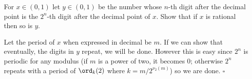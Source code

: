 
\begin{problem}[ISL 2006 N2]
    For $x \in (0, 1)$ let $y \in (0, 1)$ be the number whose $n$-th digit after the decimal point is the $2^n$-th digit after the decimal point of $x$. Show that if $x$ is rational then so is $y$.
\end{problem}

\begin{solution}
    Let the period of $x$ when expressed in decimal be $m$. If we can show that eventually, the digits in $y$ repeat, we will be done. However this is easy since $2^n$ is periodic for any modulus (if $m$ is a power of two, it becomes $0$; otherwise $2^n$ repeats with a period of $\ord_k(2)$ where $k = m/2^{\nu_2(m)}$) so we are done. $\square$
\end{solution}
